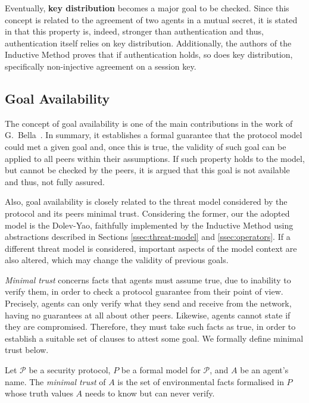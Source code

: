 Eventually, \textbf{key distribution} becomes a major goal to be checked. Since this concept is related to the agreement of two agents in a mutual secret, it is stated in \cite{BellareRogaway93} that this property is, indeed, stronger than authentication and thus, authentication itself relies on key distribution. Additionally, the authors of the Inductive Method proves that if authentication holds, so does key distribution, specifically non-injective agreement on a session key.



\subsection{Goal Availability}
The concept of goal availability is one of the main contributions in the work of G.~Bella~\cite{Bella2007}. In summary, it establishes a formal guarantee that the protocol model could met a given goal and, once this is true, the validity of such goal can be applied to all peers within their assumptions. If such property holds to the model, but cannot be checked by the peers, it is argued that this goal is not available and thus, not fully assured.

Also, goal availability is closely related to the threat model considered by the protocol and its peers minimal trust. Considering the former, our the adopted model is the Dolev-Yao, faithfully implemented by the Inductive Method using abstractions described in Sections \ref{ssec:threat-model} and \ref{ssec:operators}. If a different threat model is considered, important aspects of the model context are also altered, which may change the validity of previous goals.

\textit{Minimal trust} concerns facts that agents must assume true, due to inability to verify them, in order to check a protocol guarantee from their point of view. Precisely, agents can only verify what they send and receive from the network, having no guarantees at all about other peers. Likewise, agents cannot state if they are compromised. Therefore, they must take such facts as true, in order to establish a suitable set of clauses to attest some goal. We formally define minimal trust below.

\begin{definition}
  Let $\mathcal{P}$ be a security protocol, $P$ be a formal model for $\mathcal{P}$, and $A$ be an agent's name. The \textit{minimal trust} of $A$ is the set of environmental facts formalised in $P$ whose truth values $A$ needs to know but can never verify.
\end{definition}

